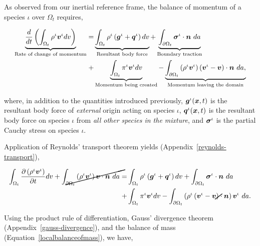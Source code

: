 As observed from our inertial reference frame, the balance of
momentum of a species $\iota$ over $\Omega_{t}$ requires,

\begin{equation}
\begin{split}
\underbrace{\frac{d}{dt}\left(\int_{\Omega_{t}} \rho^{\iota}
  \mbox{\boldmath$ v$}^{\iota} dv \right)}_{\text{Rate of change of momentum}}  = 
& \underbrace{\int_{\Omega_{t}} \rho^{\iota} \left(\mbox{\boldmath$ g$}^{\iota} +
  \mbox{\boldmath$ q$}^{\iota}\right) dv}_{\text{Resultant body force}} 
+ \underbrace{\int_{\partial \Omega_{t}}
  \mbox{\boldmath$\sigma$}^{\iota}\cdot\mbox{\boldmath$ n$}\ da}_{\text{Boundary traction}}\\ 
+ & \underbrace{\int_{\Omega_{t}} \pi^{\iota}\mbox{\boldmath$ v$}^{\iota}
  dv}_{\text{Momentum being created}}
- \underbrace{\int_{\partial \Omega_{t}} \left(\rho^{\iota}
  \mbox{\boldmath$ v$}^{\iota} \right) \left(\mbox{\boldmath$ v$}^{\iota} -
\mbox{\boldmath$ v$}\right) \cdot \mbox{\boldmath$ n$}\ da,}_{\text{Momentum leaving the domain}} 
\end{split}
\label{globalbalanceofmomentum}
\end{equation}

where, in addition to the quantities introduced previously,
$\mbox{\boldmath$ g$}^{\iota}(\mbox{\boldmath$ x$},t)$ is the resultant body force of {\em external} origin
acting on species $\iota$, $\mbox{\boldmath$ q$}^{\iota}(\mbox{\boldmath$ x$},t)$ is the resultant body
force on species $\iota$ from {\em all other species in the mixture},
and $\mbox{\boldmath$\sigma$}^{\iota}$ is the partial Cauchy stress on species $\iota$.

Application of Reynolds' transport theorem yields
(Appendix~\ref{reynolds-transport}), 

\begin{equation*}
\begin{split}
\int_{\Omega_{t}} \frac{\partial \left(\rho^{\iota}\bv^{\iota}\right)}{\partial t} dv
+\cancel{\int_{\partial \Omega_{t}} \left(\rho^{\iota}\bv^{\iota}\right) \bv \cdot \bn\ da} =
& \int_{\Omega_{t}} \rho^{\iota} \left(\bg^{\iota}+\bq^{\iota}\right) dv 
+ \int_{\partial \Omega_{t}} \Bsigma^{\iota}\cdot\bn\ da\\
+ & \int_{\Omega_{t}} \pi^{\iota}\bv^{\iota} dv
- \int_{\partial \Omega_{t}} \left(\rho^{\iota} \left(\bv^{\iota} -
\cancel{\bv}\right) \cdot \bn \right) \bv^{\iota}\ da.
\end{split}
\end{equation*}

Using the product rule of differentiation, Gauss' divergence
theorem (Appendix~\ref{gauss-divergence}), and the balance of mass
(Equation~\ref{localbalanceofmass}), we have,

